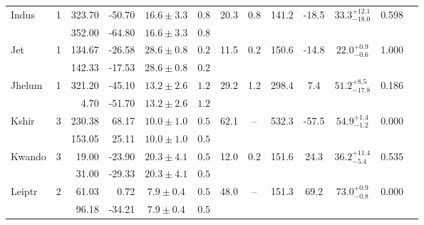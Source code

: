 \begin{tabular}{lcrrccccccccr}
	\multirow{2}{*}{Indus} & \multirow{2}{*}{1} & 323.70 & -50.70 & $16.6 \pm 3.3$ & $0.8$ & \multirow{2}{*}{20.3} & \multirow{2}{*}{0.8} & \multirow{2}{*}{141.2} & \multirow{2}{*}{-18.5} & \multirow{2}{*}{$33.3^{+12.1}_{-18.0}$} & \multirow{2}{*}{0.598} & \multirow{2}{*}{\citet{Shipp:2018}} \\
	 &  & 352.00 & -64.80 & $16.6 \pm 3.3$ & $0.8$ &  &  &  &  &  &  &  \\
	\multirow{2}{*}{Jet} & \multirow{2}{*}{1} & 134.67 & -26.58 & $28.6 \pm 0.8$ & $0.2$ & \multirow{2}{*}{11.5} & \multirow{2}{*}{0.2} & \multirow{2}{*}{150.6} & \multirow{2}{*}{-14.8} & \multirow{2}{*}{$22.0^{+0.9}_{-0.6}$} & \multirow{2}{*}{1.000} & \multirow{2}{*}{\citet{Jethwa:2018}} \\
	 &  & 142.33 & -17.53 & $28.6 \pm 0.8$ & $0.2$ &  &  &  &  &  &  &  \\
	\multirow{2}{*}{Jhelum} & \multirow{2}{*}{1} & 321.20 & -45.10 & $13.2 \pm 2.6$ & $1.2$ & \multirow{2}{*}{29.2} & \multirow{2}{*}{1.2} & \multirow{2}{*}{298.4} & \multirow{2}{*}{7.4} & \multirow{2}{*}{$51.2^{+8.5}_{-17.8}$} & \multirow{2}{*}{0.186} & \multirow{2}{*}{\citet{Shipp:2018}} \\
	 &  & 4.70 & -51.70 & $13.2 \pm 2.6$ & $1.2$ &  &  &  &  &  &  &  \\
	\multirow{2}{*}{Kshir} & \multirow{2}{*}{3} & 230.38 & 68.17 & $10.0 \pm 1.0$ & $0.5$ & \multirow{2}{*}{62.1} & \multirow{2}{*}{--} & \multirow{2}{*}{532.3} & \multirow{2}{*}{-57.5} & \multirow{2}{*}{$54.9^{+1.4}_{-1.2}$} & \multirow{2}{*}{0.000} & \multirow{2}{*}{\citet{Malhan:2019}} \\
	 &  & 153.05 & 25.11 & $10.0 \pm 1.0$ & $0.5$ &  &  &  &  &  &  &  \\
	\multirow{2}{*}{Kwando} & \multirow{2}{*}{3} & 19.00 & -23.90 & $20.3 \pm 4.1$ & $0.5$ & \multirow{2}{*}{12.0} & \multirow{2}{*}{0.2} & \multirow{2}{*}{151.6} & \multirow{2}{*}{24.3} & \multirow{2}{*}{$36.2^{+11.4}_{-5.4}$} & \multirow{2}{*}{0.535} & \multirow{2}{*}{\citet{Grillmair:2017b}} \\
	 &  & 31.00 & -29.33 & $20.3 \pm 4.1$ & $0.5$ &  &  &  &  &  &  &  \\
	\multirow{2}{*}{Leiptr} & \multirow{2}{*}{2} & 61.03 & 0.72 & $7.9 \pm 0.4$ & $0.5$ & \multirow{2}{*}{48.0} & \multirow{2}{*}{--} & \multirow{2}{*}{151.3} & \multirow{2}{*}{69.2} & \multirow{2}{*}{$73.0^{+0.9}_{-0.8}$} & \multirow{2}{*}{0.000} & \multirow{2}{*}{\citet{Ibata:2019}} \\
	 &  & 96.18 & -34.21 & $7.9 \pm 0.4$ & $0.5$ &  &  &  &  &  &  &  \\

\end{tabular}
